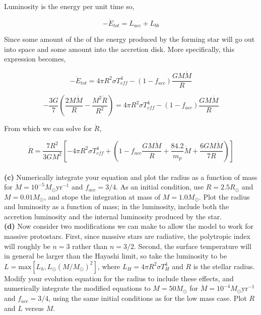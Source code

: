 \documentclass[12pt]{article}
\begin{document}
\noindent Luminosity is the energy per unit time so,

\begin{equation}
-\dot{E}_{tot} = L_{acc} + L_{bb}
\end{equation}

\noindent Since some amount of the of the energy produced by the forming star will go out into space and some amount into the accretion disk. More specifically, this expression becomes, 

\begin{equation}
-\dot{E}_{tot} = 4 \pi R^2 \sigma T^4_{eff} - \left(1 - f_{acc} \right)\frac{GM\dot{M}}{R}
\end{equation}

\begin{equation}
-\frac{3G}{7}\left(\frac{2M\dot{M}}{R} - \frac{M^2\dot{R}}{R^2} \right) = 4 \pi R^2 \sigma T^4_{eff} - \left(1 - f_{acc} \right)\frac{GM\dot{M}}{R}
\end{equation}

\noindent From which we can solve for $\dot{R}$,

\begin{equation}
\dot{R} = \frac{7R^2}{3GM^2} \left[ -4\pi R^2 \sigma T^4_{eff} + \left(1 - f_{acc}\frac{GM\dot{M}}{R} + \frac{84.2}{m_p}\dot{M} + \frac{6GM\dot{M}}{7R} \right) \right]
\end{equation} \\

\noindent \textbf{(c)} Numerically integrate your equation and plot the radius as a function of mass for $\dot{M} = 10^{-5} M_\odot \mathrm{yr}^{-1}$ and $f_{acc} = 3/4$. As an initial condition, use $R = 2.5 R_\odot$ and $M = 0.01 M_\odot$, and stope the integration at mass of $M = 1.0 M_\odot$. Plot the radius and luminosity as a function of mass; in the luminosity, include both the accretion luminosity and the internal luminosity produced by the star.\\

\noindent \textbf{(d)} Now consider two modifications we can make to allow the model to work for massive protostars. First, since massive stars are radiative, the polytropic index will roughly be $n = 3$ rather than $n = 3/2$. Second, the surface temperature will in general be larger than the Hayashi limit, so take the luminosity to be $L = \mathrm{max}\left[ L_h, L_{\odot}\left( M/M_{\odot}\right)^2\right]$, where $L_H = 4 \pi R^2 \sigma T_H^4$ and $R$ is the stellar radius. Modify your evolution equation for the radius to include these effects, and numerically integrate the modified equations to $M = 50 M_{\odot}$ for $\dot{M} = 10^{-4}  M_{\odot}  \mathrm{yr}^{-1}$ and $f_{acc} = 3/4$, using the same initial conditions as for the low mass case. Plot $R$ and $L$ versus $M$. \\
\end{document}
